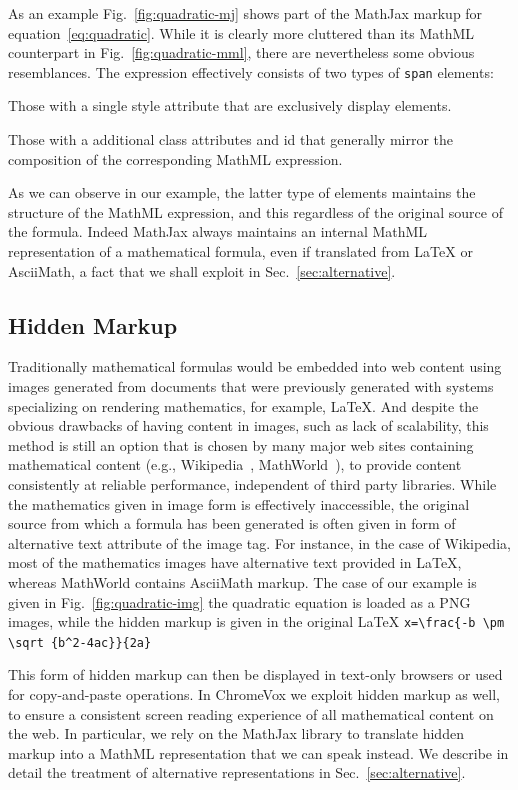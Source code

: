 \documentclass{acm_proc_article-sp}
\begin{document}
As an example Fig.~\ref{fig:quadratic-mj} shows part of the MathJax markup for
equation~\ref{eq:quadratic}. While it is clearly more cluttered than its MathML
counterpart in Fig.~\ref{fig:quadratic-mml}, there are nevertheless some obvious
resemblances. The expression effectively consists of two types of \texttt{span}
elements:
\begin{inparaenum}[(a)]
\item Those with a single style attribute that are exclusively display elements.
\item Those with a additional class attributes and id that generally mirror the
  composition of the corresponding MathML expression.
\end{inparaenum}
As we can observe in our example, the latter type of elements maintains the
structure of the MathML expression, and this regardless of the original source
of the formula. Indeed MathJax always maintains an internal MathML
representation of a mathematical formula, even if translated from {\LaTeX} or
AsciiMath, a fact that we shall exploit in Sec.~\ref{sec:alternative}.


\subsection{Hidden Markup}\label{sec:images}

Traditionally mathematical formulas would be embedded into web content using
images generated from documents that were previously generated with systems
specializing on rendering mathematics, for example, {\LaTeX}. And despite the
obvious drawbacks of having content in images, such as lack of scalability, this
method is still an option that is chosen by many major web sites containing
mathematical content (e.g., Wikipedia~\cite{wikipedia},
MathWorld~\cite{mathworld}), to provide content consistently at reliable
performance, independent of third party libraries.  While the mathematics given
in image form is effectively inaccessible, the original source from which a
formula has been generated is often given in form of alternative text attribute
of the image tag.  For instance, in the case of Wikipedia, most of the
mathematics images have alternative text provided in \LaTeX, whereas MathWorld
contains AsciiMath markup.  The case of our example is given in
Fig.~\ref{fig:quadratic-img} the quadratic equation is loaded as a PNG images,
while the hidden markup is given in the original \LaTeX
\verb+x=\frac{-b \pm \sqrt {b^2-4ac}}{2a}+


This form of hidden markup can then be displayed in
text-only browsers or used for copy-and-paste operations. 
In ChromeVox we exploit hidden markup as well, to ensure a consistent
screen reading experience of all mathematical content on the web.  In particular,
we rely on the MathJax library to translate hidden markup into a MathML
representation that we can speak instead. We describe in detail the treatment of
alternative representations in Sec.~\ref{sec:alternative}.
\end{document}
